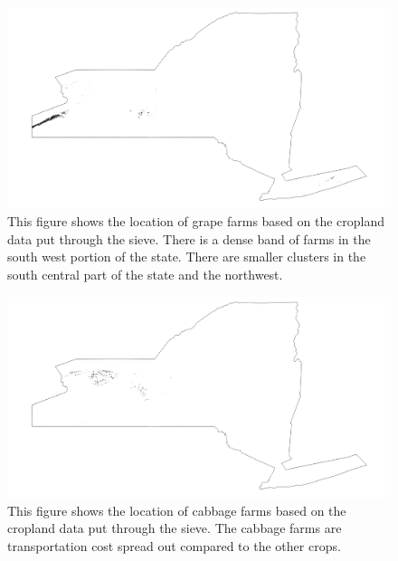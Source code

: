 \documentclass{report}
\begin{document}
\begin{figure}
\centering
\begin{framed}
\includegraphics[scale=.50]{farms_69}
\caption{This figure shows the location of grape farms based on the cropland data put through the sieve. There is a dense band of farms in the south west portion of the state. There are smaller clusters in the south central part of the state and the northwest. }
\label{fig:farms_69}
\end{framed}
\end{figure}

\begin{figure}
\centering
\begin{framed}
\includegraphics[scale=.50]{farms_243}
\caption{This figure shows the location of cabbage farms based on the cropland data put through the sieve. The cabbage farms are transportation cost spread out compared to the other crops.}
\label{fig:farms_243}
\end{framed}
\end{figure}

\end{document}
